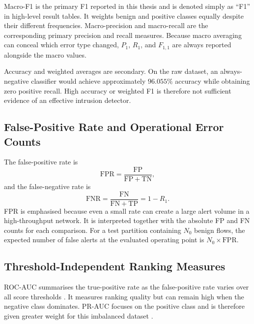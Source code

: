 \documentclass[11pt,fleqn]{report}
\begin{document}
Macro-F1 is the primary F1 reported in this thesis and is denoted simply as ``F1'' in high-level result tables. It weights benign and positive classes equally despite their different frequencies. Macro-precision and macro-recall are the corresponding primary precision and recall measures. Because macro averaging can conceal which error type changed, $P_1$, $R_1$, and $F_{1,1}$ are always reported alongside the macro values.

Accuracy and weighted averages are secondary. On the raw dataset, an always-negative classifier would achieve approximately $96.055\%$ accuracy while obtaining zero positive recall. High accuracy or weighted F1 is therefore not sufficient evidence of an effective intrusion detector.

\subsection{False-Positive Rate and Operational Error Counts}
\label{subsubsec:fpr_metric}

The false-positive rate is
\begin{equation}
    \mathrm{FPR}=\frac{\mathrm{FP}}{\mathrm{FP}+\mathrm{TN}},
    \label{eq:false_positive_rate}
\end{equation}
and the false-negative rate is
\begin{equation}
    \mathrm{FNR}=\frac{\mathrm{FN}}{\mathrm{FN}+\mathrm{TP}}
    =1-R_1.
    \label{eq:false_negative_rate}
\end{equation}
FPR is emphasised because even a small rate can create a large alert volume in a high-throughput network. It is interpreted together with the absolute FP and FN counts for each comparison. For a test partition containing $N_0$ benign flows, the expected number of false alerts at the evaluated operating point is $N_0\times\mathrm{FPR}$.

\subsection{Threshold-Independent Ranking Measures}
\label{subsubsec:ranking_metrics}

ROC-AUC summarises the true-positive rate as the false-positive rate varies over all score thresholds \cite{Fawcett2006ROC}. It measures ranking quality but can remain high when the negative class dominates. PR-AUC focuses on the positive class and is therefore given greater weight for this imbalanced dataset \cite{SaitoRehmsmeier2015}.
\end{document}
